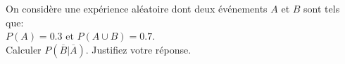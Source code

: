 \bigskip









\question[3]\label{probabilite} 

On considère une expérience aléatoire dont deux événements  $A$ et $B$ sont tels que:\\ $P(A) = 0.3 \text{ et } P(A \cup B) = 0.7$.\\ 

Calculer $P(\overline{B}|\overline{A})$. Justifiez votre réponse.\\

